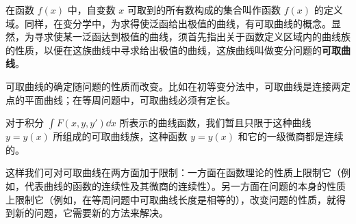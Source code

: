 在函数 $f(x)$ 中，自变数 $x$ 可取到的所有数构成的集合叫作函数 $f(x)$ 的定义域。同样，在变分学中，为求得使泛函给出极值的曲线，有可取曲线的概念。显然，为寻求使某一泛函达到极值的曲线，须首先指出关于函数定义区域内的曲线族的性质，以便在这族曲线中寻求给出极值的曲线，这族曲线叫做变分问题的\textbf{可取曲线}。

可取曲线的确定随问题的性质而改变。比如在初等变分法中，可取曲线是连接两定点的平面曲线；在等周问题中，可取曲线必须有定长。

对于积分 $\int F(x,y,y')\dd x$ 所表示的曲线函数，我们暂且只限于这种曲线 $y=y(x)$ 所组成的可取曲线族，这种函数 $y=y(x)$ 和它的一级微商都是连续的。

这样我们可对可取曲线在两方面加于限制：一方面在函数理论的性质上限制它（例如，代表曲线的函数的连续性及其微商的连续性）。另一方面在问题的本身的性质上限制它（例如，在等周问题中可取曲线长度是相等的），改变问题的性质，就得到新的问题，它需要新的方法来解决。
